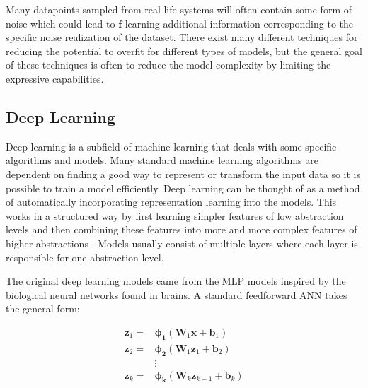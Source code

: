 \documentclass[12pt,a4paper]{book}
\begin{document}
Many datapoints sampled from real life systems will often contain some form of noise which could lead to $\bm{f}$ learning additional information corresponding to the specific noise realization of the dataset. There exist many different techniques for reducing the potential to overfit for different types of models, but the general goal of these techniques is often to reduce the model complexity by limiting the expressive capabilities.



\subsection{Deep Learning}
\label{sec:deeplearning}

Deep learning is a subfield of machine learning that deals with some specific algorithms and models. Many standard machine learning algorithms are dependent on finding a good way to represent or transform the input data so it is possible to train a model efficiently. Deep learning can be thought of as a method of automatically incorporating representation learning into the models. This works in a structured way by first learning simpler features of low abstraction levels and then combining these features into more and more complex features of higher abstractions \citep{deeplearningbook}. Models usually consist of multiple layers where each layer is responsible for one abstraction level.

The original deep learning models came from the MLP models inspired by the biological neural networks found in brains. A standard feedforward ANN takes the general form:

\begin{equation}
    \begin{split}
        \bm{z}_1 = & \bm{\phi_1}(\bm{W}_1 \bm{x} + \bm{b}_1) \\
        \bm{z}_2 = & \bm{\phi_2}(\bm{W}_1 \bm{z}_1 + \bm{b}_2) \\
        & \vdots \\
        \bm{z}_k = & \bm{\phi_k}(\bm{W}_k \bm{z}_{k-1} + \bm{b}_k) \\
    \end{split}
    \label{eq:ann_forward}
\end{equation}
\end{document}

